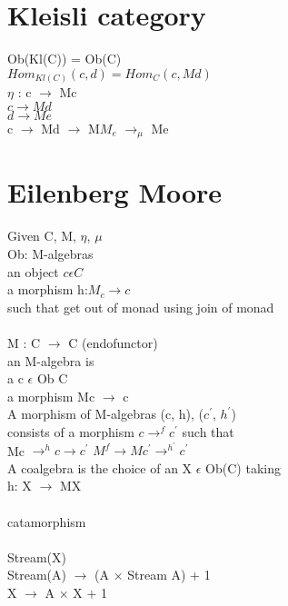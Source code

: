 \documentclass{article}
\begin{document}
\section{Kleisli category}Ob(Kl(C)) = Ob(C)
\\
$Hom_{Kl(C)} (c, d) = Hom_{C}(c, Md)$
\\
$\eta$ : c $\rightarrow$ Mc
\\
$c \rightarrow Md$
\\
$d \rightarrow Me$
\\
c $\rightarrow$ Md $\rightarrow$ M$M_{e}$ $\rightarrow_{\mu}$ Me
\\
\section{Eilenberg Moore}
Given C, M, $\eta$, $\mu$
\\
Ob: M-algebras
\\
an object $c \epsilon C$
\\
a morphism h:$M_{c} \rightarrow c$
\\
such that get out of monad using join of monad
\\
\\
M : C $\rightarrow$ C (endofunctor)
\\
an M-algebra is 
\\
a c $\epsilon$ Ob C
\\
a morphism Mc $\rightarrow$ c
\\
A morphism of M-algebras (c, h), ($c^{'}$, $h^{'}$)
\\
consists of a morphism $c \rightarrow^{f} c^{'}$
such that
\\
Mc $\rightarrow^{h} c \rightarrow c^{'}$
$M^{f} \rightarrow Mc^{'} \rightarrow^{h^{'}}c^{'}$
\\
A coalgebra is the choice of an X $\epsilon$ Ob(C) taking 
\\
h: X $\rightarrow$ MX
\\
\\
catamorphism
\\
\\
Stream(X)
\\
Stream(A) $\rightarrow$ (A $\times$ Stream A) + 1
\\
X $\rightarrow$ A $\times$ X + 1
\\
\end{document}
